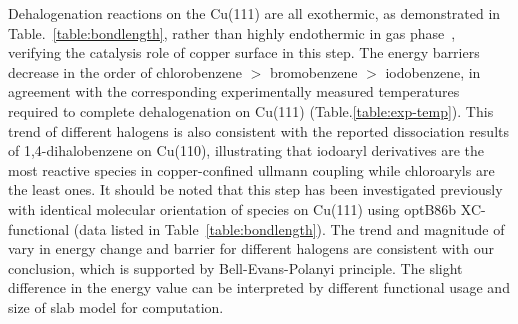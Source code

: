\documentclass[%
 reprint,
 amsmath,amssymb,
 aps,
prb,
floatfix,
]{revtex4-2}
\newcommand{\lock}{\color{red}}
\newcommand{\lock}{\color{red}}
\newcommand{\comm}{\color{Purple}} %
\newcommand{\sinfo}{Supplementary Information}
\begin{document}
{\lock


}{\color{blue}


Dehalogenation reactions on the Cu(111) are all exothermic, as demonstrated in Table.~\ref{table:bondlength}, rather than highly endothermic in gas phase~\cite{jacs2013}, verifying the catalysis role of copper surface in this step.
The energy barriers decrease in the order of chlorobenzene $>$ bromobenzene $>$ iodobenzene, in agreement with the corresponding experimentally measured temperatures required to complete dehalogenation on Cu(111) (Table.\ref{table:exp-temp}). This trend of different halogens is also consistent with the reported dissociation results of 1,4-dihalobenzene on Cu(110)\cite{ullmann_52}, illustrating that iodoaryl derivatives are the most reactive species in copper-confined ullmann coupling while chloroaryls are the least ones. It should be noted that this step has been investigated previously~\cite{jacs2013} with identical molecular orientation of species on Cu(111) using optB86b XC-functional (data listed in Table~\ref{table:bondlength}). The trend and magnitude of vary in energy change and barrier for different halogens are consistent with our conclusion, which is supported by Bell-Evans-Polanyi principle. The slight difference in the energy value can be interpreted by different functional usage and size of slab model for computation.



}
\end{document}
